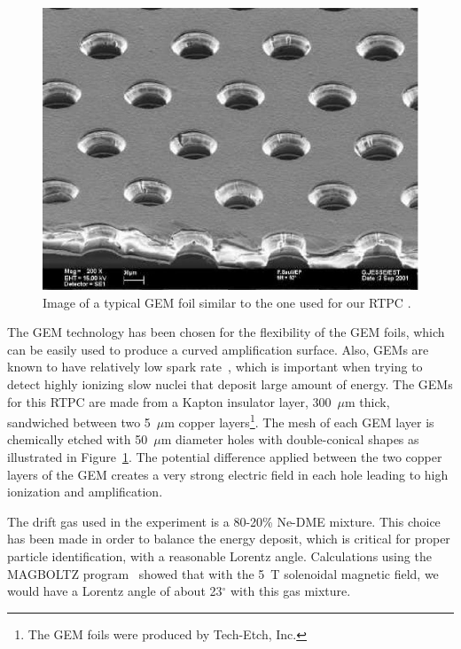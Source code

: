 \documentclass[preprint,5p]{elsarticle}
\begin{document}
\begin{figure}[tbp]
\centering
\includegraphics[scale=0.70]{GEM_photo.jpg}
\caption{Image of a typical GEM foil similar to the one used for our RTPC 
\cite{Sauli:2016eeu}.} 
   \label{fig:GEMs}
\end{figure}

The GEM technology has been chosen for the flexibility of the GEM foils,
which can be easily used to produce a curved amplification surface. Also, 
GEMs are known to have relatively low spark rate~\cite{Beringer:1900zz}, which 
is important when trying to detect 
highly ionizing slow nuclei that deposit large amount of energy. The GEMs for 
this RTPC are made from a Kapton insulator layer, 300~$\mu$m 
thick, sandwiched between two 5~$\mu$m copper layers\footnote{The GEM foils were produced by 
Tech-Etch, Inc.}. The mesh of each GEM 
layer is chemically etched with 50~$\mu$m diameter holes with double-conical 
shapes as illustrated in Figure~\ref{fig:GEMs}. The potential difference 
applied between the two copper layers of the GEM creates a very strong electric 
field in each hole leading to high ionization and amplification. 

The drift gas used in the experiment is a 80-20\% Ne-DME mixture. This choice 
has been made in order to balance the energy deposit, which is critical
for proper particle identification, with a reasonable
Lorentz angle. Calculations using the MAGBOLTZ program~\cite{Biagi:1999nwa} 
showed that with the 5~T solenoidal magnetic field, we would have a Lorentz 
angle of about 23$^\circ$ with this gas mixture.
\end{document}
